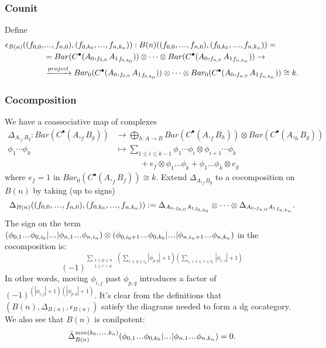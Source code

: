 \subsubsection{Counit}
Define
\begin{align*}
\epsilon_{B(n)}((f_{0,0},&\smdots,f_{n,0}), 
  (f_{0,k_0},\smdots,f_{n,k_n})):
B(n)((f_{0,0},\smdots,f_{n,0}), 
  (f_{0,k_0},\smdots,f_{n,k_n})) =\\
&=
Bar(C^\bullet(A_0, _{f_{0,0}}{A_1}_{f_{0,k_0}})) 
  \otimes \cdots \otimes 
  Bar(C^\bullet(A_0, _{f_{n,0}}{A_1}_{f_{n,k_n}}))
  \to \\
&\xrightarrow{project}
  Bar_0(C^\bullet(A_0, _{f_{0,0}}{A_1}_{f_{0,k_0}})) 
  \otimes \cdots \otimes 
  Bar_0(C^\bullet(A_0, _{f_{n,0}}{A_1}_{f_{n,k_n}}))
\cong k.
\end{align*}
%
\subsubsection{Cocomposition}
We have a coassociative map of complexes
%
\begin{align*}
\Delta_{A, _fB_g}: Bar(C^\bullet(A, _fB_g)) 
&\to \bigoplus\limits_{h: A \to B} Bar(C^\bullet(A, _fB_h)) \otimes Bar(C^\bullet(A, _hB_g)) \\
\phi_1 \cdots \phi_k 
&\mapsto \sum\limits_{1\leq i \leq k-1} 
\phi_1 \cdots \phi_i \otimes 
  \phi_{i+1} \cdots \phi_k\\
&\phantom{{}\mapsto \sum{}}
  + e_f\otimes \phi_1 \dots \phi_k + 
  \phi_1 \dots \phi_k \otimes e_g  
\end{align*}
%
where 
$e_f = 1$ in $Bar_0(C^\bullet(A, _fB_f)) \cong k$.
Extend $\Delta_{A, _fB_g}$ to a 
cocomposition on $B(n)$ by taking 
(up to signs)
$$
\Delta_{B(n)}((f_{0,0},\smdots,f_{n,0}), 
  (f_{0,k_0},\smdots,f_{n,k_n})) :=
\Delta_{A_0, _{f_{0,0}}{A_1}_{f_{0,k_0}}} 
\otimes \dots \otimes
\Delta_{A_0, _{f_{n,0}}{A_1}_{f_{n,k_n}}}.
$$
The sign on the term
$
(\phi_{0,1}\smdots \phi_{0,i_0} | \smdots |
\phi_{n,1}\smdots \phi_{n,i_n}) \otimes
(\phi_{0,i_0+1}\smdots \phi_{0,k_0} | \smdots |
\phi_{n,i_n+1}\smdots \phi_{n,k_n}) 
$
in the cocomposition is:
\begin{equation}
\label{eq:coprod_signs}
(-1)^{\sum \limits_{\substack{
  1 \leq p \leq n\\ 1 \leq r<p}}\;
(\sum \limits_{1\leq q \leq i_p} |\phi_{p,q}|+1)
(\sum \limits_{i_r+1 \leq s \leq k_r} |\phi_{r,s}|+1)}
\end{equation}
%
In other words, moving $\phi_{i,j}$ past 
$\phi_{p,q}$ introduces a factor of 
$(-1)^{(|\phi_{i,j}|+1)(|\phi_{p,q}|+1)}$.
It's clear from the definitions that
$(B(n), \Delta_{B(n)}, \epsilon_{B(n)})$ 
satisfy the diagrams needed to form a dg cocategory. 
We also see that $B(n)$ is conilpotent: 
$$
\bar{\Delta}_{B(n)}^{min(k_0,\smdots,k_n)}
(\phi_{0,1}\smdots\phi_{0,k_0}|\smdots|
\phi_{n,1}\smdots\phi_{n,k_n}) = 0.
$$
